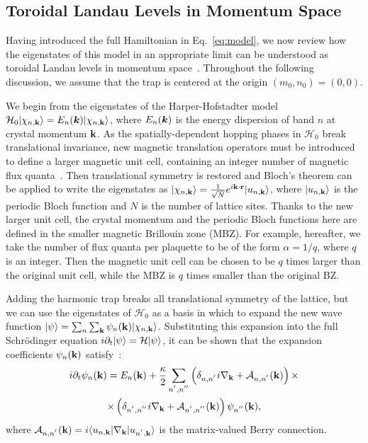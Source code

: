 \subsection{Toroidal Landau Levels in Momentum
Space}\label{sec:eigenstates}

Having introduced the full Hamiltonian in Eq.~\eqref{eq:model}, we now
review how the eigenstates of this model in an appropriate limit can
be understood as toroidal Landau levels in momentum
space~\cite{price2014magnetic}. Throughout the following discussion,
we assume that the trap is centered at the origin $(m_0, n_0)= (0,0)$.

We begin from the eigenstates of the Harper-Hofstadter model
$\mathcal{H}_0\vert \chi_{n,\mathbf{k}} \rangle = E_n (\bm{k})
\vert \chi_{n,\mathbf{k}} \rangle$, where $E_n (\bm{k})$ is the energy dispersion of
band $n$ at crystal momentum $\mathbf{k}$. As the spatially-dependent
hopping phases in $\mathcal{H}_0$ break translational invariance, new
magnetic translation operators must be introduced to define a larger
magnetic unit cell, containing an integer number of magnetic flux
quanta~\cite{zak1964group, zak1964representations, 1chang}. Then
translational symmetry is restored and Bloch's theorem can be applied
to write the eigenstates as $\vert \chi_{n,\mathbf{k}} \rangle =
\frac{1}{\sqrt{N}} e^{i\mathbf{k}\cdot \mathbf{r}} \vert u_{n,\mathbf{k}} \rangle$, where
$\vert u_{n,\mathbf{k}} \rangle$ is the periodic Bloch function and $N$ is the
number of lattice sites. Thanks to the new larger unit cell, the
crystal momentum and the periodic Bloch functions here are defined in
the smaller magnetic Brillouin zone (MBZ). For example, hereafter, we
take the number of flux quanta per plaquette to be of the form
$\alpha=1/q$, where $q$ is an integer. Then the magnetic unit cell can
be chosen to be $q$ times larger than the original unit cell, while
the MBZ is $q$ times smaller than the original BZ.

Adding the harmonic trap breaks all translational symmetry of the
lattice, but we can use the eigenstates of $\mathcal{H}_0$ as a basis
in which to expand the new wave function $\vert \psi \rangle =
\sum_n\sum_{\mathbf{k}} \psi_n(\mathbf{k})
\vert \chi_{n,\mathbf{k}} \rangle$. Substituting this expansion into the full
Schr\"{o}dinger equation $i \partial_t \vert \psi \rangle = \mathcal{H}
\vert \psi \rangle$, it can be shown that the expansion coefficients
$\psi_n(\mathbf{k})$ satisfy~\cite{price2014magnetic}:
%
\begin{multline} i \partial_t \psi_n(\mathbf{k}) = E_n(\mathbf{k}) +
\frac{\kappa}{2}\sum_{n^{'},n^{''}}\left(\delta_{n,n^{'}}i
\nabla_{\mathbf{k}} + \mathcal{A}_{n,n^{'}}(\mathbf{k})\right)\times \\ \times
\left(\delta_{n^{'},n^{''}}i\nabla_{\mathbf{k}} +
\mathcal{A}_{n^{'},n^{''}}(\mathbf{k})\right) \psi_{n^{''}}(\mathbf{k})
, \label{eq:first}
\end{multline} where $\mathcal{A}_{n,n^{'}}(\mathbf{k}) =
i\langle u_{n,\mathbf{k}} \vert\nabla_{\mathbf{k}}\vert u_{n^{'},\mathbf{k}} \rangle$ is the
matrix-valued Berry connection.

